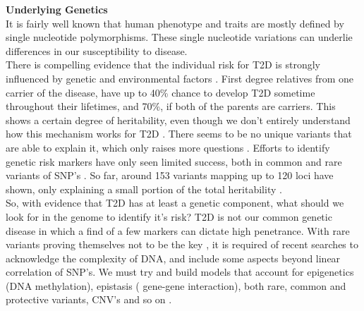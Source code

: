 \documentclass[12pt]{article}
\begin{document}
\textbf{Underlying Genetics}
\vspace{0.1in} \\
\indent 
It is fairly well known that human phenotype and traits are mostly defined by single nucleotide polymorphisms. These single nucleotide variations can underlie differences in our susceptibility to disease.\\
\indent 
There is compelling evidence that the individual risk for T2D is strongly influenced by genetic and environmental factors \cite{mccarthy2009genome}. First degree relatives from one carrier of the disease, have up to 40\% chance to develop T2D sometime throughout their lifetimes, and 70\%, if both of the parents are carriers. This shows a certain degree of heritability, even though we don't entirely understand how this mechanism works for T2D . There seems to be no unique variants that are able to explain it, which only raises more questions \cite{prasad2015genetics}. Efforts to identify genetic risk markers have only seen limited success, both in common and rare variants of SNP's \cite{fuchsberger2016genetic}. So far, around 153 variants mapping up to 120 loci have shown, only explaining a small portion of the total heritability \cite{prasad2015genetics} . \\
\indent 
So, with evidence that T2D has at least a genetic component, what should we look for in the genome to identify it's risk? T2D is not our common genetic disease in which a find of a few markers can dictate high penetrance. With rare variants proving themselves not to be the key \cite{fuchsberger2016genetic}, it is required of recent searches to acknowledge the complexity of DNA, and include some aspects beyond linear correlation of SNP's. We must try and build models that account for epigenetics (DNA methylation), epistasis ( gene-gene interaction), both rare, common and protective variants, CNV's and so on \cite{prasad2015genetics}. \\
\end{document}
